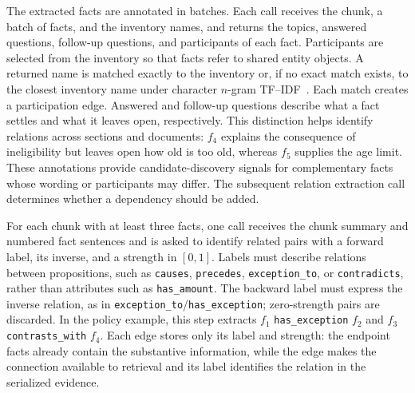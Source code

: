 \documentclass[sigconf, review, anonymous]{acmart}
\begin{document}
The extracted facts are annotated in batches. Each call receives the chunk,
a batch of facts, and the inventory names, and returns the topics, answered
questions, follow-up questions, and participants of each fact. Participants
are selected from the inventory so that facts refer to shared entity objects.
A returned name is matched exactly to the inventory or, if no exact match
exists, to the closest inventory name under character $n$-gram TF--IDF~\cite{salton1988term}.
Each match creates a participation edge. Answered and follow-up questions describe what a fact settles
and what it leaves open, respectively. This distinction helps
identify relations across sections and documents: $f_4$ explains
the consequence of ineligibility but leaves open how old is too
old, whereas $f_5$ supplies the age limit. These annotations provide candidate-discovery signals for complementary
facts whose wording or participants may differ. The subsequent relation
extraction call determines whether a dependency should be added. 

For each chunk with at least three facts, one call receives
the chunk summary and numbered fact sentences and is asked to identify
related pairs with a forward label, its inverse, and a
strength in $[0,1]$. Labels must describe relations between
propositions, such as \texttt{causes}, \texttt{precedes},
\texttt{exception\_to}, or \texttt{contradicts}, rather than
attributes such as \texttt{has\_amount}. The backward label
must express the inverse relation, as in
\texttt{exception\_to}/\texttt{has\_exception}; zero-strength
pairs are discarded. In the policy example, this step extracts
$f_1$ \texttt{has\_exception} $f_2$ and
$f_3$ \texttt{contrasts\_with} $f_4$.
Each edge stores only its label and strength: the endpoint
facts already contain the substantive information, while the edge makes the connection available to retrieval
and its label identifies the relation in the serialized evidence.
\end{document}
